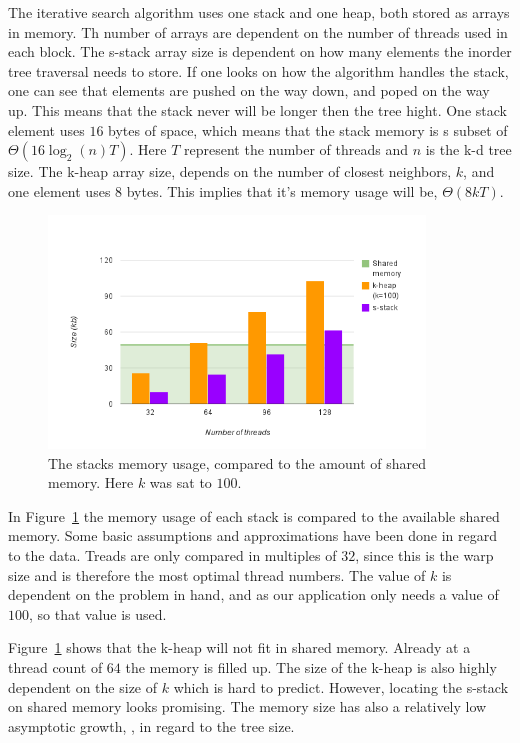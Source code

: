 The iterative search algorithm uses one stack and one heap, both stored as arrays in memory. Th number of arrays are dependent on the number of threads used in each block. The s-stack array size is dependent on how many elements the inorder tree traversal needs to store. If one looks on how the algorithm handles the stack, one can see that elements are pushed on the way down, and poped on the way up. This means that the stack never will be longer then the tree hight. One stack element uses $16$ bytes of space, which means that the stack memory is s subset of $\Theta(16\log_2(n)T)$. Here $T$ represent the number of threads and $n$ is the k-d tree size. The k-heap array size, depends on the number of closest neighbors, $k$, and one element uses $8$ bytes. This implies that it's memory usage will be, $\Theta(8kT)$.

\begin{figure}[ht]
\centering
\includegraphics[width=100mm]{../gfx/shared_memory_and_stack.png}

\caption{The stacks memory usage, compared to the amount of shared memory. Here $k$ was sat to $100$.}
\label{fig:stacks_and_shared_memory}
\end{figure}

In Figure~\ref{fig:stacks_and_shared_memory} the memory usage of each stack is compared to the available shared memory. Some basic assumptions and approximations have been done in regard to the data. Treads are only compared in multiples of $32$, since this is the warp size and is therefore the most optimal thread numbers. The value of $k$ is dependent on the problem in hand, and as our application only needs a value of $100$, so that value is used. 

Figure~\ref{fig:stacks_and_shared_memory} shows that the k-heap will not fit in shared memory. Already at a thread count of $64$ the memory is filled up. The size of the k-heap is also highly dependent on the size of $k$ which is hard to predict. However, locating the s-stack on shared memory looks promising. The memory size has also a relatively low asymptotic growth, , in regard to the tree size.

